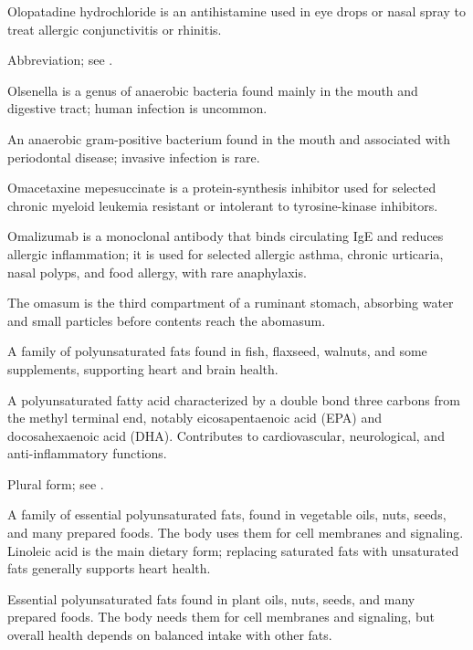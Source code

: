  Olopatadine hydrochloride is an antihistamine used in eye drops or nasal spray to treat allergic conjunctivitis or rhinitis.

 Abbreviation; see .

 Olsenella is a genus of anaerobic bacteria found mainly in the mouth and digestive tract; human infection is uncommon.

 An anaerobic gram-positive bacterium found in the mouth and associated with periodontal disease; invasive infection is rare.

 Omacetaxine mepesuccinate is a protein-synthesis inhibitor used for selected chronic myeloid leukemia resistant or intolerant to tyrosine-kinase inhibitors.

 Omalizumab is a monoclonal antibody that binds circulating IgE and reduces allergic inflammation; it is used for selected allergic asthma, chronic urticaria, nasal polyps, and food allergy, with rare anaphylaxis.

 The omasum is the third compartment of a ruminant stomach, absorbing water and small particles before contents reach the abomasum.

 A family of polyunsaturated fats found in fish, flaxseed, walnuts, and some supplements, supporting heart and brain health.

 A polyunsaturated fatty acid characterized by a double bond three carbons from the methyl terminal end, notably eicosapentaenoic acid (EPA) and docosahexaenoic acid (DHA). Contributes to cardiovascular, neurological, and anti-inflammatory functions.

 Plural form; see .

 A family of essential polyunsaturated fats, found in vegetable oils, nuts, seeds, and many prepared foods. The body uses them for cell membranes and signaling. Linoleic acid is the main dietary form; replacing saturated fats with unsaturated fats generally supports heart health.

 Essential polyunsaturated fats found in plant oils, nuts, seeds, and many prepared foods. The body needs them for cell membranes and signaling, but overall health depends on balanced intake with other fats.


